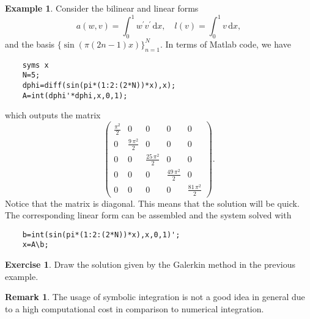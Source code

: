 \documentclass{amsart}
\theoremstyle{definition}
\newtheorem{remark}{Remark}
\newtheorem{exercise}{\color{red}Exercise}
\newtheorem{example}{Example}
\begin{document}
\begin{example}
  \label{ex:diagonal}
  Consider the bilinear and linear forms
  \begin{equation}
    a(w,v) = \int_0^1 w^\prime v^\prime\,\mathrm{d}x, \quad l(v) = \int_0^1 v\,\mathrm{d}x,
  \end{equation}
  and the basis $\{\sin (\pi (2n-1) x)\}_{n=1}^N$. In terms of Matlab
  code, we have
  \begin{lstlisting}
    syms x
    N=5;
    dphi=diff(sin(pi*(1:2:(2*N))*x),x);
    A=int(dphi'*dphi,x,0,1);
  \end{lstlisting}
  which outputs the matrix
  \begin{equation}
\left(\begin{array}{ccccc} \frac{{\pi}^2}{2} & 0 & 0 & 0 & 0\\ 0 & \frac{9\, {\pi}^2}{2} & 0 & 0 & 0\\ 0 & 0 & \frac{25\, {\pi}^2}{2} & 0 & 0\\ 0 & 0 & 0 & \frac{49\, {\pi}^2}{2} & 0\\ 0 & 0 & 0 & 0 & \frac{81\, {\pi}^2}{2} \end{array}\right).
  \end{equation}
  Notice that the matrix is diagonal. This means that the solution
will be quick.  The corresponding linear form can be assembled and
the system solved with
  \begin{lstlisting}
    b=int(sin(pi*(1:2:(2*N))*x),x,0,1)';
    x=A\b;
  \end{lstlisting}
\end{example}

\begin{exercise}
  Draw the solution given by the Galerkin method in the previous example.
\end{exercise}

\begin{remark}
  The usage of symbolic integration is not a good idea in general due
to a high computational cost in comparison to numerical integration.
\end{remark}
\end{document}
